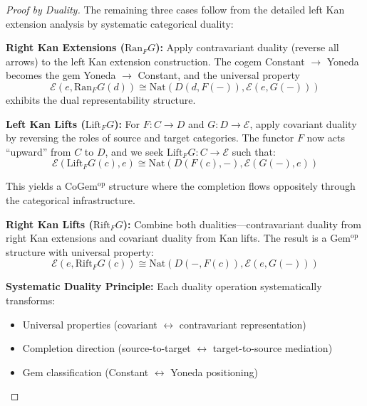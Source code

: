 \documentclass[11pt]{article}
\theoremstyle{plain}
\theoremstyle{definition}
\theoremstyle{remark}
\begin{document}
\begin{proof}[Proof by Duality]
The remaining three cases follow from the detailed left Kan extension analysis by systematic categorical duality:

\textbf{Right Kan Extensions ($\mathrm{Ran}_F G$):} Apply contravariant duality (reverse all arrows) to the left Kan extension construction. The cogem Constant $\to$ Yoneda becomes the gem Yoneda $\to$ Constant, and the universal property 
\begin{equation}
\mathcal{E}(e, \mathrm{Ran}_F G(d)) \cong \mathrm{Nat}(D(d, F(-)), \mathcal{E}(e, G(-)))
\end{equation}
exhibits the dual representability structure.

\textbf{Left Kan Lifts ($\mathrm{Lift}_F G$):} For $F : C \to D$ and $G : D \to \mathcal{E}$, apply covariant duality by reversing the roles of source and target categories. The functor $F$ now acts ``upward'' from $C$ to $D$, and we seek $\mathrm{Lift}_F G : C \to \mathcal{E}$ such that:
\begin{equation}
\mathcal{E}(\mathrm{Lift}_F G(c), e) \cong \mathrm{Nat}(D(F(c), -), \mathcal{E}(G(-), e))
\end{equation}

This yields a CoGem$^{\mathrm{op}}$ structure where the completion flows oppositely through the categorical infrastructure.

\textbf{Right Kan Lifts ($\mathrm{Rift}_F G$):} Combine both dualities---contravariant duality from right Kan extensions and covariant duality from Kan lifts. The result is a Gem$^{\mathrm{op}}$ structure with universal property:
\begin{equation}
\mathcal{E}(e, \mathrm{Rift}_F G(c)) \cong \mathrm{Nat}(D(-, F(c)), \mathcal{E}(e, G(-)))
\end{equation}

\textbf{Systematic Duality Principle:} Each duality operation systematically transforms:
\begin{itemize}
\item Universal properties (covariant $\leftrightarrow$ contravariant representation)
\item Completion direction (source-to-target $\leftrightarrow$ target-to-source mediation)  
\item Gem classification (Constant $\leftrightarrow$ Yoneda positioning)
\end{itemize}
\end{proof}
\end{document}
